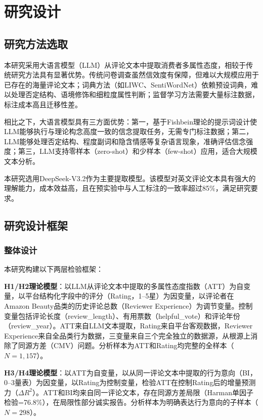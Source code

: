 \section{研究设计}

\subsection{研究方法选取}

本研究采用大语言模型（LLM）从评论文本中提取消费者多属性态度，相较于传统研究方法具有显著优势。传统问卷调查虽然信效度有保障，但难以大规模应用于已存在的海量评论文本；词典方法（如LIWC、SentiWordNet）依赖预设词典，难以处理否定结构、语境修饰和细粒度属性判断；监督学习方法需要大量标注数据，标注成本高且迁移性差。

相比之下，大语言模型具有三方面优势：第一，基于Fishbein理论的提示词设计使LLM能够执行与理论构念高度一致的信念提取任务，无需专门标注数据；第二，LLM能够处理否定结构、程度副词和隐含情感等复杂语言现象，准确评估信念强度；第三，LLM支持零样本（zero-shot）和少样本（few-shot）应用，适合大规模文本分析\cite{grimmer2022}。

本研究选用DeepSeek-V3.2作为主要提取模型。该模型对英文评论文本具有强大的理解能力，成本效益高，且在预实验中与人工标注的一致率超过85\%，满足研究要求。

\subsection{研究设计框架}

\subsubsection{整体设计}

本研究构建以下两层检验框架：

\textbf{H1/H2理论模型}：以LLM从评论文本中提取的多属性态度指数（ATT）为自变量，以平台结构化字段中的评分（Rating，1--5星）为因变量，以评论者在Amazon Beauty品类的历史评论总数（Reviewer Experience）为调节变量。控制变量包括评论长度（review\_length）、有用票数（helpful\_vote）和评论年份（review\_year）。ATT来自LLM文本提取，Rating来自平台客观数据，Reviewer Experience来自全品类行为数据，三变量来自三个完全独立的数据源，从根源上消除了同源方差（CMV）问题。分析样本为ATT和Rating均完整的全样本（$N=1{,}157$）。

\textbf{H3/H4理论模型}：以ATT为自变量，以从同一评论文本中提取的行为意向（BI，0--3量表）为因变量，以Rating为控制变量，检验ATT在控制Rating后的增量预测力（$\Delta R^2$）。ATT和BI均来自同一评论文本，存在同源方差局限（Harman单因子检验=76.8\%），在局限性部分诚实报告。分析样本为明确表达行为意向的子样本（$N=298$）。


